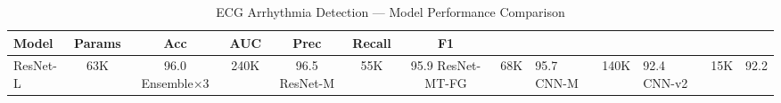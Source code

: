 \begin{table}[htbp]
  \centering
  \caption{ECG Arrhythmia Detection — Model Performance Comparison}
  \label{tab:model_comparison}
  \begin{tabular}{lcccccc}
    \toprule
    Model & Params & Acc & AUC & Prec & Recall & F1 \\
    \midrule
    ResNet-L & 63K & 96.0%
    Ensemble×3 & 240K & 96.5%
    ResNet-M & 55K & 95.9%
    ResNet-MT-FG & 68K & 95.7%
    CNN-M & 140K & 92.4%
    CNN-v2 & 15K & 92.2%
    \bottomrule
  \end{tabular}
\end{table}
